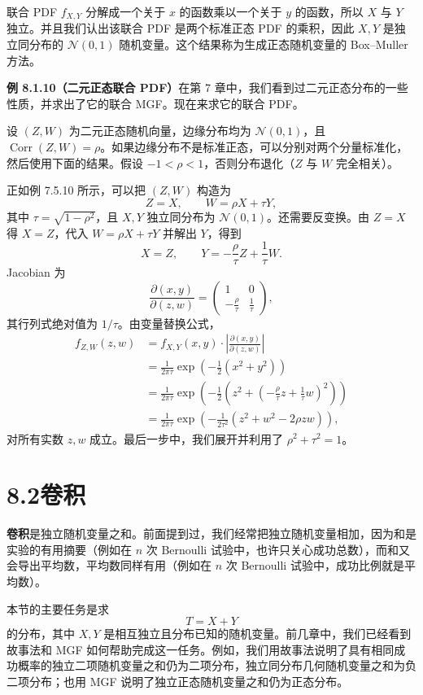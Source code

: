 \documentclass[UTF8, 12pt, fontset=fandol, oneside]{ctexart}
\begin{document}
联合 PDF $f_{X,Y}$ 分解成一个关于 $x$ 的函数乘以一个关于 $y$ 的函数，所以 $X$ 与 $Y$ 独立。并且我们认出该联合 PDF 是两个标准正态 PDF 的乘积，因此 $X,Y$ 是独立同分布的 $\mathcal N(0,1)$ 随机变量。这个结果称为生成正态随机变量的 Box--Muller 方法。

\noindent\textbf{例 8.1.10（二元正态联合 PDF）}\quad 在第 7 章中，我们看到过二元正态分布的一些性质，并求出了它的联合 MGF。现在来求它的联合 PDF。

设 $(Z,W)$ 为二元正态随机向量，边缘分布均为 $\mathcal N(0,1)$，且 $\operatorname{Corr}(Z,W)=\rho$。如果边缘分布不是标准正态，可以分别对两个分量标准化，然后使用下面的结果。假设 $-1<\rho<1$，否则分布退化（$Z$ 与 $W$ 完全相关）。

正如例 7.5.10 所示，可以把 $(Z,W)$ 构造为
\[
  Z=X,\qquad W=\rho X+\tau Y,
\]
其中 $\tau=\sqrt{1-\rho^2}$，且 $X,Y$ 独立同分布为 $\mathcal N(0,1)$。还需要反变换。由 $Z=X$ 得 $X=Z$，代入 $W=\rho X+\tau Y$ 并解出 $Y$，得到
\[
  X=Z,\qquad Y=-\frac{\rho}{\tau}Z+\frac1{\tau}W.
\]
Jacobian 为
\[
  \frac{\partial(x,y)}{\partial(z,w)}
  =
  \begin{pmatrix}
    1 & 0\\
    -\frac{\rho}{\tau} & \frac1{\tau}
  \end{pmatrix},
\]
其行列式绝对值为 $1/\tau$。由变量替换公式，
\[
\begin{aligned}
  f_{Z,W}(z,w)
  &=f_{X,Y}(x,y)\cdot
    \left|\frac{\partial(x,y)}{\partial(z,w)}\right|\\
  &=\frac{1}{2\pi\tau}\exp\left(-\frac12(x^2+y^2)\right)\\
  &=\frac{1}{2\pi\tau}\exp\left(
    -\frac12\left(z^2+\left(-\frac{\rho}{\tau}z+\frac1{\tau}w\right)^2\right)\right)\\
  &=\frac{1}{2\pi\tau}\exp\left(
    -\frac{1}{2\tau^2}(z^2+w^2-2\rho zw)\right),
\end{aligned}
\]
对所有实数 $z,w$ 成立。最后一步中，我们展开并利用了 $\rho^2+\tau^2=1$。

\section*{8.2\quad 卷积}

\textbf{卷积}是独立随机变量之和。前面提到过，我们经常把独立随机变量相加，因为和是实验的有用摘要（例如在 $n$ 次 Bernoulli 试验中，也许只关心成功总数），而和又会导出平均数，平均数同样有用（例如在 $n$ 次 Bernoulli 试验中，成功比例就是平均数）。

本节的主要任务是求
\[
  T=X+Y
\]
的分布，其中 $X,Y$ 是相互独立且分布已知的随机变量。前几章中，我们已经看到故事法和 MGF 如何帮助完成这一任务。例如，我们用故事法说明了具有相同成功概率的独立二项随机变量之和仍为二项分布，独立同分布几何随机变量之和为负二项分布；也用 MGF 说明了独立正态随机变量之和仍为正态分布。
\end{document}
